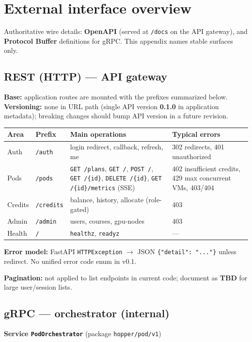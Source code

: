 \documentclass[12pt,a4paper]{article}
\begin{document}
\section{External interface overview}
\label{app:interfaces}

Authoritative wire details: \textbf{OpenAPI} (served at \texttt{/docs} on the API gateway), and \textbf{Protocol Buffer} definitions for gRPC. This appendix names stable surfaces only.

\subsection{REST (HTTP) --- API gateway}
\textbf{Base:} application routes are mounted with the prefixes summarized below. \textbf{Versioning:} none in URL path (single API version \textbf{0.1.0} in application metadata); breaking changes should bump API version in a future revision.

\begin{tabularx}{\textwidth}{@{}L{2.2cm} L{1.5cm} X X@{}}
  \toprule
  \textbf{Area} & \textbf{Prefix} & \textbf{Main operations} & \textbf{Typical errors} \\
  \midrule
  Auth & \texttt{/auth} & login redirect, callback, refresh, me & 302 redirects, 401 unauthorized \\
  Pods & \texttt{/pods} & \texttt{GET /plans}, \texttt{GET /}, \texttt{POST /}, \texttt{GET /\{id\}}, \texttt{DELETE /\{id\}}, \texttt{GET /\{id\}/metrics} (SSE) & 402 insufficient credits, 429 max concurrent VMs, 403/404 \\
  Credits & \texttt{/credits} & balance, history, allocate (role-gated) & 403 \\
  Admin & \texttt{/admin} & users, courses, gpu-nodes & 403 \\
  Health & \texttt{/} & \texttt{healthz}, \texttt{readyz} & --- \\
  \bottomrule
\end{tabularx}

\vspace{0.5em}
\noindent\textbf{Error model:} FastAPI \texttt{HTTPException} $\rightarrow$ JSON \texttt{\{"detail": "..."\}} unless redirect. No unified error code enum in v0.1.

\noindent\textbf{Pagination:} not applied to list endpoints in current code; document as \textbf{TBD} for large user/session lists.

\subsection{gRPC --- orchestrator (internal)}
\textbf{Service \texttt{PodOrchestrator}} (package \texttt{hopper/pod/v1})
\end{document}
